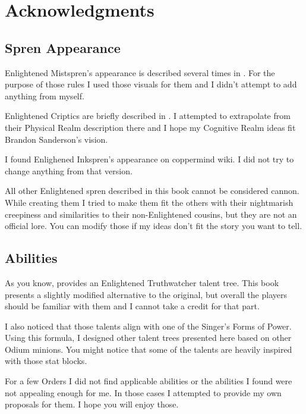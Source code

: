 \newpage
\section{Acknowledgments}
\label{sec:corruptedRulesAcknowledgments}



\subsection{Spren Appearance}

Enlightened Mistspren's appearance is described several times in \bookSA{}. For the purpose of those rules I used those visuals for them and I didn't attempt to add anything from myself.

Enlightened Criptics are briefly described in \bookWAT{}. I attempted to extrapolate from their Physical Realm description there and I hope my Cognitive Realm ideas fit Brandon Sanderson's vision.

I found Enlighened Inkspren's appearance on coppermind wiki. I did not try to change anything from that version.

All other Enlightened spren described in this book cannot be considered cannon. While creating them I tried to make them fit the others with their nightmarish creepiness and similarities to their non-Enlightened cousins, but they are not an official lore. You can modify those if my ideas don't fit the story you want to tell.



\subsection{Abilities}

As you know, \handbook{} provides an Enlightened Truthwatcher talent tree. This book presents a slightly modified alternative to the original, but overall the players should be familiar with them and I cannot take a credit for that part.

I also noticed that those talents align with one of the Singer's Forms of Power. Using this formula, I designed other talent trees presented here based on other Odium minions. You might notice that some of the talents are heavily inspired with those stat blocks.

For a few Orders I did not find applicable abilities or the abilities I found were not appealing enough for me. In those cases I attempted to provide my own proposals for them. I hope you will enjoy those.



